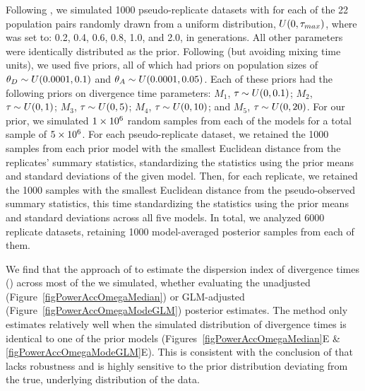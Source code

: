 \documentclass[letterpaper,12pt]{article}
\begin{document}
\begin{linenumbers}
Following \citet{Oaks2012}, we simulated 1000 pseudo-replicate datasets with
\divt{} for each of the 22 population pairs randomly drawn from a uniform
distribution, $U(0, \tau_{max})$, where  was set to: 0.2, 0.4, 0.6,
0.8, 1.0, and 2.0, in \globalcoalunit generations.
All other parameters were identically distributed as the prior.
Following \citet{Hickerson2013} (but avoiding mixing time units), we used five
priors, all of which had priors on population sizes of $\meanDescendantTheta{}
\sim U(0.0001, 0.1)$ and $\ancestralTheta{} \sim U(0.0001, 0.05)$.
Each of these priors had the following priors on divergence time parameters:
$M_1$, $\tau_{} \sim U(0, 0.1)$;
$M_2$, $\tau_{} \sim U(0, 1)$;
$M_3$, $\tau_{} \sim U(0, 5)$;
$M_4$, $\tau_{} \sim U(0, 10)$; and
$M_5$, $\tau_{} \sim U(0, 20)$.
For our prior, we simulated $1\times 10^{6}$ random samples from each of the models
for a total sample of $5\times 10^{6}$.
For each pseudo-replicate dataset, we retained the 1000 samples from each prior
model with the smallest Euclidean distance from the replicates' summary
statistics, standardizing the statistics using the prior means and standard
deviations of the given model.
Then, for each replicate, we retained the 1000 samples with the smallest
Euclidean distance from the pseudo-observed summary statistics, this time
standardizing the statistics using the prior means and standard deviations
across all five models.
In total, we analyzed 6000 replicate datasets, retaining 1000 model-averaged
posterior samples from each of them.

We find that the approach of \citet{Hickerson2013} to estimate the dispersion
index of divergence times (\vmratio{}) across most of the  we
simulated, whether evaluating the unadjusted
(Figure~\ref{figPowerAccOmegaMedian}) or GLM-adjusted
(Figure~\ref{figPowerAccOmegaModeGLM}) posterior estimates.
The method only estimates \vmratio{} relatively well when the simulated
distribution of divergence times is identical to one of the prior models
(Figures~\ref{figPowerAccOmegaMedian}E \& \ref{figPowerAccOmegaModeGLM}E).
This is consistent with the conclusion of \citet{Oaks2012} that \msb lacks
robustness and is highly sensitive to the prior distribution deviating from the
true, underlying distribution of the data.


\end{linenumbers}
\end{document}
